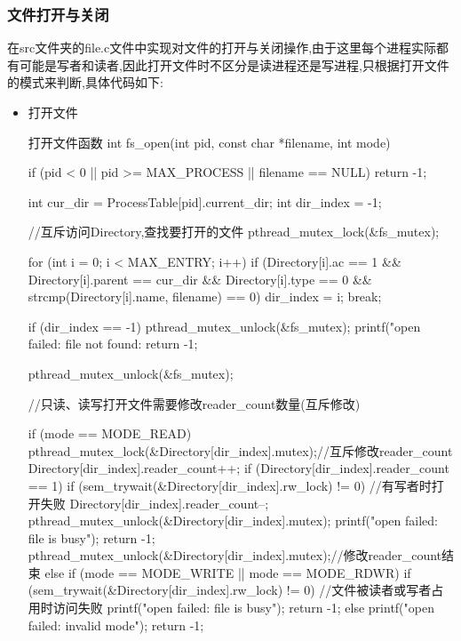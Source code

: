 \subsubsection{文件打开与关闭}
在src文件夹的file.c文件中实现对文件的打开与关闭操作,由于这里每个进程实际都有可能是写者和读者,因此打开文件时不区分是读进程还是写进程,只根据打开文件的模式来判断,具体代码如下:
\begin{itemize}
    \item 打开文件
    \begin{ccode}{打开文件函数}
int fs_open(int pid, const char *filename, int mode)
{
    if (pid < 0 || pid >= MAX_PROCESS || filename == NULL) {
        return -1;
    }

    int cur_dir = ProcessTable[pid].current_dir;
    int dir_index = -1;

    //互斥访问Directory,查找要打开的文件
    pthread_mutex_lock(&fs_mutex);

    for (int i = 0; i < MAX_ENTRY; i++) {
        if (Directory[i].ac == 1 &&
            Directory[i].parent == cur_dir &&
            Directory[i].type == 0 &&
            strcmp(Directory[i].name, filename) == 0) {
            dir_index = i;
            break;
        }
    }

    if (dir_index == -1) {
        pthread_mutex_unlock(&fs_mutex);
        printf("open failed: file not found: %
        return -1;
    }

    pthread_mutex_unlock(&fs_mutex);

    //只读、读写打开文件需要修改reader_count数量(互斥修改)

    if (mode == MODE_READ) {
        pthread_mutex_lock(&Directory[dir_index].mutex);//互斥修改reader_count
        Directory[dir_index].reader_count++;
        if (Directory[dir_index].reader_count == 1) {
            if (sem_trywait(&Directory[dir_index].rw_lock) != 0) { //有写者时打开失败
                Directory[dir_index].reader_count--;
                pthread_mutex_unlock(&Directory[dir_index].mutex);
                printf("open failed: file is busy\n");
                return -1;
            }
        }
        pthread_mutex_unlock(&Directory[dir_index].mutex);//修改reader_count结束
    }
    else if (mode == MODE_WRITE || mode == MODE_RDWR) {
        if (sem_trywait(&Directory[dir_index].rw_lock) != 0) {  //文件被读者或写者占用时访问失败
            printf("open failed: file is busy\n");
            return -1;
        }
    }
    else {
        printf("open failed: invalid mode\n");
        return -1;
    }

}
\end{ccode}
\end{itemize}
